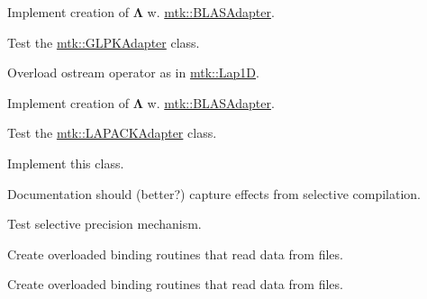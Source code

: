 \begin{DoxyRefList}
Implement creation of $ \mathbf{\Lambda}$ w. \hyperlink{classmtk_1_1BLASAdapter}{mtk\-::\-B\-L\-A\-S\-Adapter}.  
\item[\label{todo__todo000019}%
\hypertarget{todo__todo000019}{}%
File \hyperlink{mtk__glpk__adapter__test_8cc}{mtk\-\_\-glpk\-\_\-adapter\-\_\-test.cc} ]Test the \hyperlink{classmtk_1_1GLPKAdapter}{mtk\-::\-G\-L\-P\-K\-Adapter} class.  
\item[\label{todo__todo000013}%
\hypertarget{todo__todo000013}{}%
File \hyperlink{mtk__grad__1d_8cc}{mtk\-\_\-grad\-\_\-1d.cc} ]Overload ostream operator as in \hyperlink{classmtk_1_1Lap1D}{mtk\-::\-Lap1\-D}.

Implement creation of $ \mathbf{\Lambda}$ w. \hyperlink{classmtk_1_1BLASAdapter}{mtk\-::\-B\-L\-A\-S\-Adapter}.  
\item[\label{todo__todo000020}%
\hypertarget{todo__todo000020}{}%
File \hyperlink{mtk__lapack__adapter__test_8cc}{mtk\-\_\-lapack\-\_\-adapter\-\_\-test.cc} ]Test the \hyperlink{classmtk_1_1LAPACKAdapter}{mtk\-::\-L\-A\-P\-A\-C\-K\-Adapter} class.  
\item[\label{todo__todo000003}%
\hypertarget{todo__todo000003}{}%
File \hyperlink{mtk__quad__1d_8h}{mtk\-\_\-quad\-\_\-1d.h} ]Implement this class.  
\item[\label{todo__todo000004}%
\hypertarget{todo__todo000004}{}%
File \hyperlink{mtk__roots_8h}{mtk\-\_\-roots.h} ]Documentation should (better?) capture effects from selective compilation.

Test selective precision mechanism.  
\item[\label{todo__todo000006}%
\hypertarget{todo__todo000006}{}%
File \hyperlink{mtk__uni__stg__grid__1d_8h}{mtk\-\_\-uni\-\_\-stg\-\_\-grid\-\_\-1d.h} ]Create overloaded binding routines that read data from files.  
\item[\label{todo__todo000007}%
\hypertarget{todo__todo000007}{}%
File \hyperlink{mtk__uni__stg__grid__2d_8h}{mtk\-\_\-uni\-\_\-stg\-\_\-grid\-\_\-2d.h} ]Create overloaded binding routines that read data from files. 
\end{DoxyRefList}